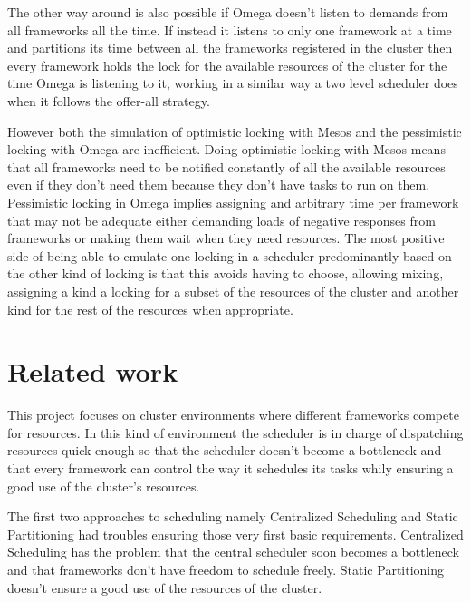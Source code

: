 \documentclass{svjour3}                     %
\begin{document}
The other way around is also possible if Omega doesn't listen to
demands from all frameworks all the time. If instead it listens to only
one framework at a time and partitions its time between all the
frameworks registered in the cluster then every framework holds the
lock for the available resources of the cluster for the time Omega is
listening to it, working in a similar way a two level scheduler does
when it follows the offer-all strategy.

However both the simulation of optimistic locking with Mesos and the
pessimistic locking with Omega are inefficient. Doing optimistic
locking with Mesos means that all frameworks need to be notified
constantly of all the available resources even if they don't need them
because they don't have tasks to run on them. Pessimistic locking in
Omega implies assigning and arbitrary time per framework that may not
be adequate either demanding loads of negative responses from
frameworks or making them wait when they need resources. The most positive
side of being able to emulate one locking in a scheduler predominantly
based on the other kind of locking is that this avoids having to
choose, allowing mixing, assigning a kind a locking for a subset of
the resources of the cluster and another kind for the rest of the
resources when appropriate.





\section{Related work}

This project focuses on cluster environments where different
frameworks compete for resources. In this kind of environment the
scheduler is in charge of dispatching resources quick enough
so that the scheduler doesn't become a bottleneck and that every
framework can control the way it schedules its tasks whily ensuring
a good use of the cluster's resources. 

The first two approaches to scheduling namely Centralized Scheduling
and Static Partitioning had troubles ensuring those very first basic
requirements. Centralized Scheduling has the problem that the central
scheduler soon becomes a bottleneck and that frameworks don't have
freedom to schedule freely. Static Partitioning doesn't ensure a good
use of the resources of the cluster.
\end{document}

